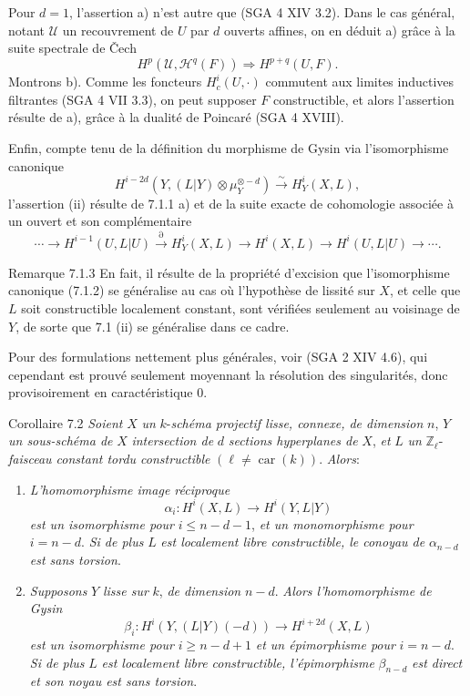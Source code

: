 Pour $d=1$, l'assertion a) n'est autre que (SGA 4 XIV 3.2). Dans le cas général, notant $\mathcal{U}$ un recouvrement de $U$ par $d$ ouverts affines, on en déduit a) grâce à la suite spectrale de Čech
\[
H^p(\mathcal{U},\mathcal{H}^q(F))\Rightarrow H^{p+q}(U,F).
\]
Montrons b). Comme les foncteurs $H_c^i(U,\cdot)$ commutent aux limites inductives filtrantes (SGA 4 VII 3.3), on peut supposer $F$ constructible, et alors l'assertion résulte de a), grâce à la dualité de Poincaré (SGA 4 XVIII).

Enfin, compte tenu de la définition du morphisme de Gysin via l'isomorphisme canonique
\[
H^{i-2d}(Y,(L|Y)\otimes\mu_Y^{\otimes -d})\xrightarrow{\sim} H^i_Y(X,L),
\tag{7.1.2}
\]
l'assertion (ii) résulte de 7.1.1 a) et de la suite exacte de cohomologie associée à un ouvert et son complémentaire
\[
\cdots\to H^{i-1}(U,L|U)\xrightarrow{\partial}H^i_Y(X,L)\to H^i(X,L)\to H^i(U,L|U)\to\cdots .
\]

\begin{statement}{Remarque 7.1.3}
En fait, il résulte de la propriété d'excision que l'isomorphisme canonique (7.1.2) se généralise au cas où l'hypothèse de lissité sur $X$, et celle que $L$ soit constructible localement constant, sont vérifiées seulement au voisinage de $Y$, de sorte que 7.1 (ii) se généralise dans ce cadre.

Pour des formulations nettement plus générales, voir (SGA 2 XIV 4.6), qui cependant est prouvé seulement moyennant la résolution des singularités, donc provisoirement en caractéristique $0$.
\end{statement}

\begin{statement}{Corollaire 7.2}
\emph{Soient} $X$ \emph{un} $k$-\emph{schéma projectif lisse, connexe, de dimension} $n$, $Y$ \emph{un sous-schéma de} $X$ \emph{intersection de} $d$ \emph{sections hyperplanes de} $X$, \emph{et} $L$ \emph{un} $\mathbb{Z}_\ell$-\emph{faisceau constant tordu constructible} $(\ell\ne\operatorname{car}(k))$. \emph{Alors}:
\begin{enumerate}[label=(\roman*)]
\item \emph{L'homomorphisme image réciproque}
\[
\alpha_i:H^i(X,L)\to H^i(Y,L|Y)
\]
\emph{est un isomorphisme pour} $i\le n-d-1$, \emph{et un monomorphisme pour} $i=n-d$. \emph{Si de plus} $L$ \emph{est localement libre constructible, le conoyau de} $\alpha_{n-d}$ \emph{est sans torsion}.
\item \emph{Supposons} $Y$ \emph{lisse sur} $k$, \emph{de dimension} $n-d$. \emph{Alors l'homomorphisme de Gysin}
\[
\beta_i:H^i(Y,(L|Y)(-d))\to H^{i+2d}(X,L)
\]
\emph{est un isomorphisme pour} $i\ge n-d+1$ \emph{et un épimorphisme pour} $i=n-d$. \emph{Si de plus} $L$ \emph{est localement libre constructible, l'épimorphisme} $\beta_{n-d}$ \emph{est direct et son noyau est sans torsion}.
\end{enumerate}
\end{statement}

